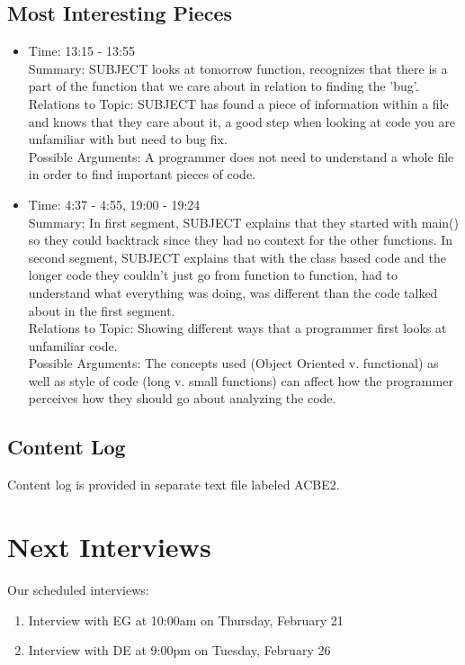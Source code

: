\documentclass{article}
\begin{document}
\subsection{Most Interesting Pieces}
\begin{itemize}
  \item Time: 13:15 - 13:55\\
  Summary: SUBJECT looks at tomorrow function, recognizes that there is a part of the function that we care about in relation to finding the 'bug'. \\
  Relations to Topic: SUBJECT has found a piece of information within a file and knows that they care about it, a good step when looking at code you are unfamiliar with but need to bug fix. \\
  Possible Arguments: A programmer does not need to understand a whole file in order to find important pieces of code.
  \item Time: 4:37 - 4:55, 19:00 - 19:24\\
  Summary: In first segment, SUBJECT explains that they started with main() so they could backtrack since they had no context for the other functions. In second segment, SUBJECT explains that with the class based code and the longer code they couldn't just go from function to function, had to understand what everything was doing, was different than the code talked about in the first segment. \\
  Relations to Topic: Showing different ways that a programmer first looks at unfamiliar code. \\
  Possible Arguments: The concepts used (Object Oriented v. functional) as well as style of code (long v. small functions) can affect how the programmer perceives how they should go about analyzing the code.
\end{itemize}

\subsection{Content Log}
Content log is provided in separate text file labeled ACBE2.

\newpage
\section{Next Interviews}
Our scheduled interviews:
\begin{enumerate}
  \item Interview with EG at 10:00am on Thursday, February 21
  \item Interview with DE at 9:00pm on Tuesday, February 26
\end{enumerate}
\end{document}
